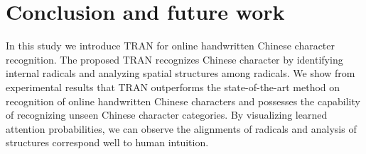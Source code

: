 \documentclass[a4paper,conference]{IEEEtran}
\begin{document}
\section{Conclusion and future work}
\label{sec:Conclusion and future work}
In this study we introduce TRAN for online handwritten Chinese character recognition. The proposed TRAN recognizes Chinese character by identifying internal radicals and analyzing spatial structures among radicals. We show from experimental results that TRAN outperforms the state-of-the-art method on recognition of online handwritten Chinese characters and possesses the capability of recognizing unseen Chinese character categories. By visualizing learned attention probabilities, we can observe the alignments of radicals and analysis of structures correspond well to human intuition.











\end{document}
